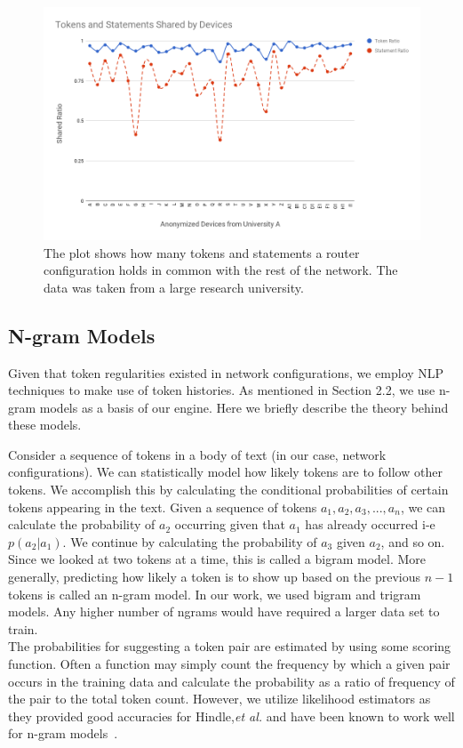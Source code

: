 \begin{figure}[H]
	\centering
	\includegraphics[width=\textwidth]{chart.png}
	\caption{The plot shows how many tokens and statements a router configuration holds in common with the rest of the network. The data was taken from a large research university.}
\end{figure}

\subsection{N-gram Models}

Given that token regularities existed in network configurations, we employ NLP techniques to make use of token histories. As mentioned in Section 2.2, we use n-gram models as a basis of our engine. Here we briefly describe the theory behind these models. 

Consider a sequence of tokens in a body of text (in our case, network configurations). We can statistically model how likely tokens are to follow other tokens. We accomplish this by calculating the conditional probabilities of certain tokens appearing in the text. Given a sequence of tokens $a_1,a_2,a_3,...,a_n$, we can calculate the probability of $a_2$ occurring given that $a_1$ has already occurred i-e $p(a_2 | a_1)$. We continue by calculating the probability of $a_3$ given $a_2$, and so on. Since we looked at two tokens at a time, this is called a bigram model. More generally, predicting how likely a token is to show up based on the previous $n-1$ tokens is called an n-gram model. In our work, we used bigram and trigram models. Any higher number of ngrams would have required a larger data set to train.\\

The probabilities for suggesting a token pair are estimated by using some scoring function. Often a function may simply count the frequency by which a given pair occurs in the training data and calculate the probability as a ratio of frequency of the pair to the total token count. However, we utilize likelihood estimators as they provided good accuracies for Hindle,\textit{et al.} and have been known to work well for n-gram models~\cite{manning}.

